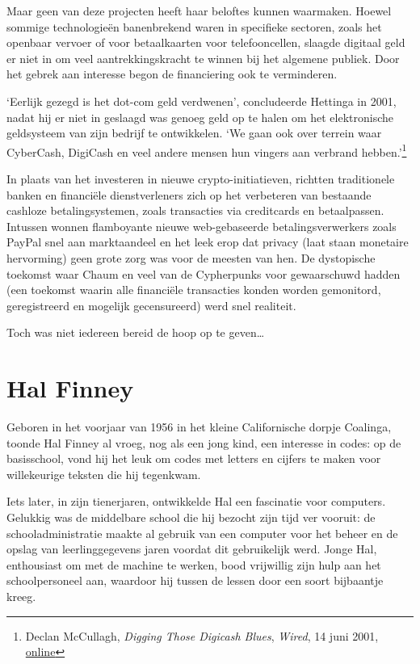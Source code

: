 \documentclass[
  a5paper,
  smalldemyvopaper,11pt,twoside,onecolumn,openright,extrafontsizes,
hidelinks]{memoir}
\begin{document}
Maar geen van deze projecten heeft haar beloftes kunnen waarmaken.
Hoewel sommige technologieën banenbrekend waren in specifieke sectoren,
zoals het openbaar vervoer of voor betaalkaarten voor telefooncellen,
slaagde digitaal geld er niet in om veel aantrekkingskracht te winnen
bij het algemene publiek. Door het gebrek aan interesse begon de
financiering ook te verminderen.

`Eerlijk gezegd is het dot-com geld verdwenen', concludeerde Hettinga in
2001, nadat hij er niet in geslaagd was genoeg geld op te halen om het
elektronische geldsysteem van zijn bedrijf te ontwikkelen. `We gaan ook
over terrein waar CyberCash, DigiCash en veel andere mensen hun vingers
aan verbrand hebben.'\footnote{Declan McCullagh, \emph{Digging Those
  Digicash Blues}, \emph{Wired}, 14 juni 2001,
  \href{https://www.wired.com/2001/06/digging-those-digicash-blues/}{online}}

In plaats van het investeren in nieuwe crypto-initiatieven, richtten
traditionele banken en financiële dienstverleners zich op het verbeteren
van bestaande cashloze betalingsystemen, zoals transacties via
creditcards en betaalpassen. Intussen wonnen flamboyante nieuwe
web-gebaseerde betalingsverwerkers zoals PayPal snel aan marktaandeel en
het leek erop dat privacy (laat staan \hspace{0pt}\hspace{0pt}monetaire
hervorming) geen grote zorg was voor de meesten van hen. De dystopische
toekomst waar Chaum en veel van de Cypherpunks voor gewaarschuwd hadden
(een toekomst waarin alle financiële transacties konden worden
gemonitord, geregistreerd en mogelijk gecensureerd) werd snel realiteit.

Toch was niet iedereen bereid de hoop op te geven\ldots{}

\section{Hal Finney}\label{hal-finney}

Geboren in het voorjaar van 1956 in het kleine Californische dorpje
Coalinga, toonde Hal Finney al vroeg, nog als een jong kind, een
interesse in codes: op de basisschool, vond hij het leuk om codes met
letters en cijfers te maken voor willekeurige teksten die hij tegenkwam.

Iets later, in zijn tienerjaren, ontwikkelde Hal een fascinatie voor
computers. Gelukkig was de middelbare school die hij bezocht zijn tijd
ver vooruit: de schooladministratie maakte al gebruik van een computer
voor het beheer en de opslag van leerlinggegevens jaren voordat dit
gebruikelijk werd. Jonge Hal, enthousiast om met de machine te werken,
bood vrijwillig zijn hulp aan het schoolpersoneel aan, waardoor hij
tussen de lessen door een soort bijbaantje kreeg.
\end{document}
